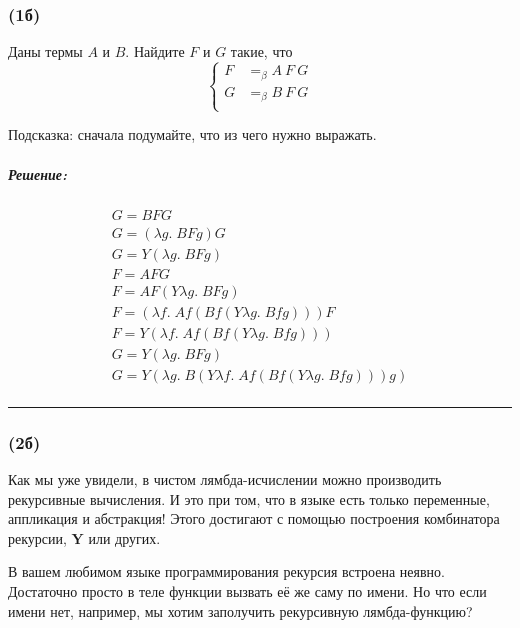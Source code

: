\documentclass{article}
\newenvironment{proof}{\subparagraph{\hspace{-1em}Решение:\newline}}{\par\noindent\rule{\textwidth}{0.4pt}}
\newcommand{\comb}[1]{\mathbf{#1}}
\newcommand{\eqbeta}{=_\beta}
\begin{document}
    \subsubsection{(1б)}

    Даны термы $A$ и $B$.
    Найдите $F$ и $G$ такие, что
    \[
        \left\{
            \begin{aligned}
                F &\eqbeta A~F~G \\
                G &\eqbeta B~F~G \\
            \end{aligned}\right.
    \]

    Подсказка: сначала подумайте, что из чего нужно выражать.

    \begin{proof}
        \begin{gather*}
            G = B F G\\
            G = (\lambda g.\; B F g) G\\
            G = Y (\lambda g.\; B F g)\\
            F = A F G\\
            F = A F (Y \lambda g.\; B F g)\\
            F = (\lambda f.\; A f (B f (Y \lambda g.\; B f g))) F\\
            F = Y (\lambda f.\; A f (B f (Y \lambda g.\; B f g)))\\
            G = Y (\lambda g.\; B F g)\\
            G = Y (\lambda g.\; B (Y \lambda f.\; A f (B f (Y \lambda g.\; B f g))) g)\\
        \end{gather*}
    \end{proof}

    \subsubsection{(2б)}

    Как мы уже увидели, в чистом лямбда-исчислении можно производить рекурсивные вычисления.
    И это при том, что в языке есть только переменные, аппликация и абстракция!
    Этого достигают с помощью построения комбинатора рекурсии, $\comb{Y}$ или других.

    В вашем любимом языке программирования рекурсия встроена неявно.
    Достаточно просто в теле функции вызвать её же саму по имени.
    Но что если имени нет, например, мы хотим заполучить рекурсивную лямбда-функцию?
\end{document}
